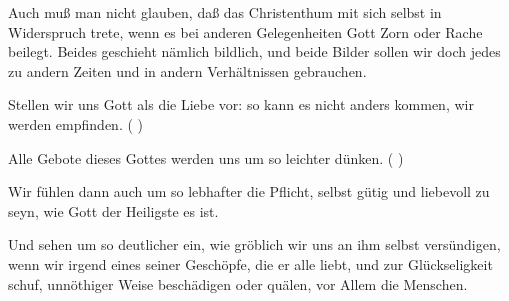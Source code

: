 \begin{RWanm} 
Auch muß man nicht glauben, daß das Christenthum mit sich selbst in Widerspruch trete, wenn es bei anderen Gelegenheiten Gott Zorn oder Rache beilegt. Beides geschieht nämlich bildlich, und beide Bilder sollen wir doch jedes zu andern Zeiten und in andern Verhältnissen gebrauchen.
\end{RWanm}

\begin{aufza}
\item Stellen wir uns Gott als die Liebe vor: so kann es nicht anders kommen, wir werden  empfinden. ( )
\item Alle Gebote dieses Gottes werden uns um so leichter dünken. ( )
\item Wir fühlen dann auch um so lebhafter die Pflicht, selbst gütig und liebevoll zu seyn, wie Gott der Heiligste es ist.
\item Und sehen um so deutlicher ein, wie gröblich wir uns an ihm selbst versündigen, wenn wir irgend eines seiner Geschöpfe, die er alle liebt, und zur Glückseligkeit schuf, unnöthiger Weise beschädigen oder quälen, vor Allem die Menschen.~
\end{aufza}

